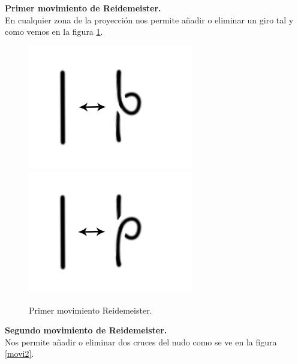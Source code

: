 \documentclass[14pt]{extarticle}
\begin{document}
	\textbf{Primer movimiento de Reidemeister.}\\
En cualquier zona de la proyección nos permite añadir o eliminar un giro tal y como vemos en la figura \ref{movi1}.\\

  \begin{figure}[h!]
  	\includegraphics[width=7.2cm]{movi1.png}
  	\includegraphics[width=7.2cm]{movi2.png}
  	\centering
  	\caption{Primer movimiento Reidemeister.}
  	\label{movi1} 
  \end{figure}
  
	\textbf{Segundo movimiento de Reidemeister.}\\
Nos permite añadir o eliminar dos cruces del nudo como se ve en la figura \ref{movi2}.\\
\end{document}
